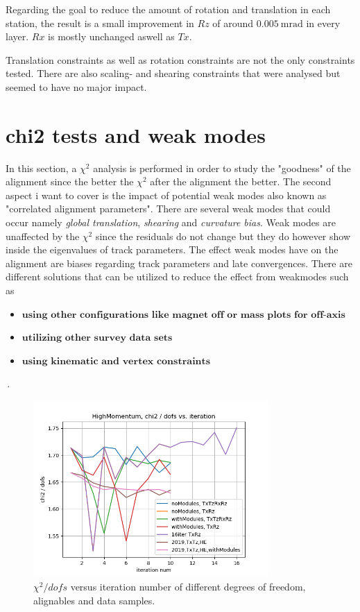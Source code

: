 Regarding the goal to reduce the amount of rotation and translation in each station,
the result is a small improvement in $Rz$ of around $\SI{0.005}{\milli\radian}$ in every layer. $Rx$ is mostly unchanged aswell as $Tx$.

Translation constraints as well as rotation constraints are not the only constraints tested. There are also scaling- and shearing constraints that were analysed but seemed to have no major impact.

\section{chi2 tests and weak modes}
In this section, a $\chi^2$ analysis is performed in order to study the "goodness" of the alignment since the better the $\chi^2$ after the alignment the better.
The second aspect i want to cover is the impact of potential weak modes also known as "correlated alignment parameters". There are several weak modes that could occur namely \textit{global translation}, \textit{shearing} and \textit{curvature bias}.
Weak modes are unaffected by the $\chi^2$ since the residuals do not change but they do however show inside the eigenvalues of track parameters.
The effect weak modes have on the alignment are biases regarding track parameters and late convergences.
There are different solutions that can be utilized to reduce the effect from weakmodes such as
\begin{itemize}
  \item $\textbf{using other configurations like magnet off or mass plots for off-axis events}$
  \item $\textbf{utilizing other survey data sets}$
  \item $\textbf{using kinematic and vertex constraints}$
\end{itemize}\,.

\begin{figure}
  \centering
  \includegraphics[width=0.8\textwidth]{plots/nov_19/Figure_2.png}
  \caption{$\chi^2 / dofs$ versus iteration number of different degrees of freedom, alignables and data samples.}
  \label{fig:fig2}
\end{figure}

